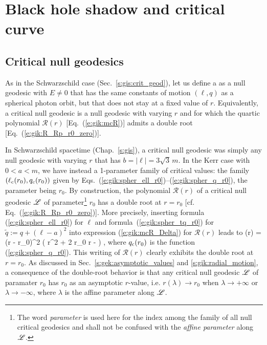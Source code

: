 \section{Black hole shadow and critical curve} \label{s:gik:shadow}

\subsection{Critical null geodesics} \label{s:gik:critical_geod}

As in the Schwarzschild case (Sec.~\ref{s:gis:crit_geod}), let us define
a 
as a null geodesic with $E\neq 0$ that has the same constants of motion
$(\ell,q)$ as a spherical photon orbit, but that does not stay at a fixed value
of $r$. Equivalently, a critical null geodesic
is a null geodesic with varying $r$ and for which the quartic polynomial $\mathcal{R}(r)$
[Eq.~(\ref{e:gik:mcR})] admits a double root [Eq.~(\ref{e:gik:R_Rp_r0_zero})].

In Schwarzschild spacetime (Chap.~\ref{s:gis}),
a critical null geodesic was simply any null geodesic with varying $r$
that has $b = |\ell| = 3\sqrt{3}\, m$.
In the Kerr case with $0 < a < m$, we have instead a 1-parameter family of critical values:
the family $(\ell_{\rm c}(r_0),q_{\rm c}(r_0))$ given by Eqs.~(\ref{e:gik:spher_ell_r0})--(\ref{e:gik:spher_q_r0}), the
parameter being $r_0$. By construction, the polynomial $\mathcal{R}(r)$
of a critical null geodesic $\mathscr{L}$ of parameter\footnote{The word \emph{parameter} is
used here for the index among the family of all null critical geodesics and shall
not be confused with the \emph{affine parameter} along $\mathscr{L}$.} $r_0$ has a double root at $r=r_0$
[cf. Eq.~(\ref{e:gik:R_Rp_r0_zero})]. More precisely, inserting formula
(\ref{e:gik:spher_ell_r0}) for $\ell$ and formula~(\ref{e:gik:spher_tq_r0})
for $\tilde{q} := q + (\ell - a)^2$
into expression (\ref{e:gik:mcR_Delta}) for $\mathcal{R}(r)$ leads to
\be \label{e:gik:mR_critical_null}
    (r) = (r - r_0)^2 \left( r^2 + 2 r_0 r -  \right) ,
\ee
where $q_{\rm c}(r_0)$ is the function (\ref{e:gik:spher_q_r0}).
This writing of $\mathcal{R}(r)$ clearly exhibits the double root at $r=r_0$.
As discussed in Sec.~\ref{s:gek:asymptotic_values} and \ref{s:gik:radial_motion},
a consequence of the double-root behavior is that
any critical null geodesic $\mathscr{L}$ of paramater $r_0$ has
$r_0$ as an asymptotic $r$-value, i.e. $r(\lambda)\to r_0$
when $\lambda\to+\infty$ or $\lambda\to-\infty$, where $\lambda$ is the affine
parameter along $\mathscr{L}$.

